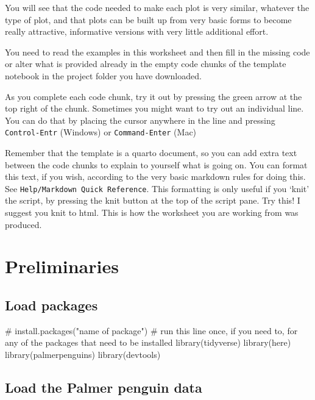 \documentclass[
  letterpaper,
  DIV=11,
  numbers=noendperiod]{scrreprt}
\newenvironment{Shaded}{\begin{snugshade}}{\end{snugshade}}
\newcommand{\CommentTok}[1]{\textcolor[rgb]{0.37,0.37,0.37}{#1}}
\newcommand{\FunctionTok}[1]{\textcolor[rgb]{0.28,0.35,0.67}{#1}}
\newcommand{\NormalTok}[1]{\textcolor[rgb]{0.00,0.23,0.31}{#1}}
\begin{document}
You will see that the code needed to make each plot is very similar,
whatever the type of plot, and that plots can be built up from very
basic forms to become really attractive, informative versions with very
little additional effort.

You need to read the examples in this worksheet and then fill in the
missing code or alter what is provided already in the empty code chunks
of the template notebook in the project folder you have downloaded.

As you complete each code chunk, try it out by pressing the green arrow
at the top right of the chunk. Sometimes you might want to try out an
individual line. You can do that by placing the cursor anywhere in the
line and pressing \texttt{Control-Entr} (Windows) or
\texttt{Command-Enter} (Mac)

Remember that the template is a quarto document, so you can add extra
text between the code chunks to explain to yourself what is going on.
You can format this text, if you wish, according to the very basic
markdown rules for doing this. See
\texttt{Help/Markdown\ Quick\ Reference}. This formatting is only useful
if you `knit' the script, by pressing the knit button at the top of the
script pane. Try this! I suggest you knit to html. This is how the
worksheet you are working from was produced.

\section{Preliminaries}\label{preliminaries-1}

\subsection{Load packages}\label{load-packages-1}

\begin{Shaded}
\begin{Highlighting}[]
\CommentTok{\# install.packages("name of package") \# run this line once, if you need to, for any of the packages that need to be installed}
\FunctionTok{library}\NormalTok{(tidyverse)}
\FunctionTok{library}\NormalTok{(here)}
\FunctionTok{library}\NormalTok{(palmerpenguins)}
\FunctionTok{library}\NormalTok{(devtools)}
\end{Highlighting}
\end{Shaded}

\subsection{Load the Palmer penguin
data}\label{load-the-palmer-penguin-data}
\end{document}
